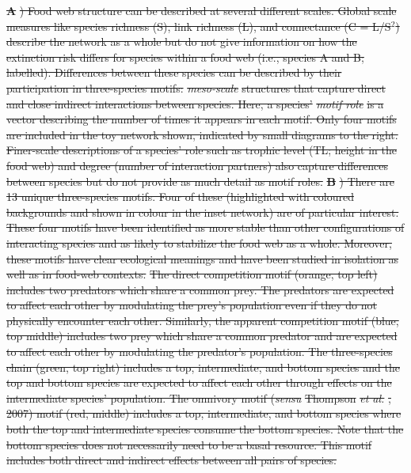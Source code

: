 \documentclass[12pt]{article}
\providecommand{\DIFdel}[1]{{\protect\color{red}\sout{#1}}}                      %
\providecommand{\DIFdelbegin}{\protect\color{red}} %
\providecommand{\DIFdelFL}[1]{\DIFdel{#1}} %
\newcommand{\DIFscaledelfig}{0.5}
\newlength{\DIFdelgraphicswidth} %
\newlength{\DIFdelgraphicsheight} %
\newcommand{\DIFdelincludegraphics}[2][]{%
\sbox{\DIFdelgraphicsbox}{\DIFOincludegraphics[#1]{#2}}%
\settoboxwidth{\DIFdelgraphicswidth}{\DIFdelgraphicsbox} %
\settoboxtotalheight{\DIFdelgraphicsheight}{\DIFdelgraphicsbox} %
\scalebox{\DIFscaledelfig}{%
\parbox[b]{\DIFdelgraphicswidth}{\usebox{\DIFdelgraphicsbox}\\[-\baselineskip] \rule{\DIFdelgraphicswidth}{0em}}\llap{\resizebox{\DIFdelgraphicswidth}{\DIFdelgraphicsheight}{%
\setlength{\unitlength}{\DIFdelgraphicswidth}%
\begin{picture}(1,1)%
\thicklines\linethickness{2pt} %
{\color[rgb]{1,0,0}\put(0,0){\framebox(1,1){}}}%
{\color[rgb]{1,0,0}\put(0,0){\line( 1,1){1}}}%
{\color[rgb]{1,0,0}\put(0,1){\line(1,-1){1}}}%
\end{picture}%
}\hspace*{3pt}}} %
} %
\DeclareRobustCommand{\DIFdelbegin}{\DIFOdelbegin \let\includegraphics\DIFdelincludegraphics} %
\begin{document}
\begin{spacing}{2.0}
    
    \DIFdelbegin %
{%
\textbf{\DIFdelFL{A}}%
\DIFdelFL{) Food web structure can be described at several different scales. Global scale measures like species richness (S), link richness (L), and connectance (C = L/S$^2$) describe the network as a whole but do not give information on how the extinction risk differs for species within a food web (i.e., species A and B; labelled). Differences between these species can be described by their participation in three-species motifs: }\emph{\DIFdelFL{meso-scale}} %
\DIFdelFL{structures that capture direct and close indirect interactions between species. Here, a species' }\emph{\DIFdelFL{motif role}} %
\DIFdelFL{is a vector describing the number of times it appears in each motif. Only four motifs are included in the toy network shown, indicated by small diagrams to the right. Finer-scale descriptions of a species' role such as trophic level (TL; height in the food web) and degree (number of interaction partners) also capture differences between species but do not provide as much detail as motif roles.}%
\textbf{\DIFdelFL{B}}%
\DIFdelFL{) There are 13 unique three-species motifs. Four of these (highlighted with coloured backgrounds and shown in colour in the inset network) are of particular interest. These four motifs have been identified as more stable than other configurations of interacting species and as likely to stabilize the food web as a whole. Moreover, these motifs have clear ecological meanings and have been studied in isolation as well as in food-web contexts.}%
\DIFdelFL{The direct competition motif (orange, top left) includes two predators which share a common prey. The predators are expected to affect each other by modulating the prey's population even if they do not physically encounter each other. Similarly, the apparent competition motif (blue, top middle) includes two prey which share a common predator and are expected to affect each other by modulating the predator's population. 
        The three-species chain (green, top right) includes a top, intermediate, and bottom species and the top and bottom species are expected to affect each other through effects on the intermediate species' population. The omnivory motif (}\emph{\DIFdelFL{sensu}} %
\DIFdelFL{Thompson }\emph{\DIFdelFL{et al.}}%
\DIFdelFL{, 2007) motif (red, middle) includes a top, intermediate, and bottom species where both the top and intermediate species consume the bottom species. Note that the bottom species does not necessarily need to be a basal resource. This motif includes both direct and indirect effects between all pairs of species.}}


\end{spacing}
\end{document}
